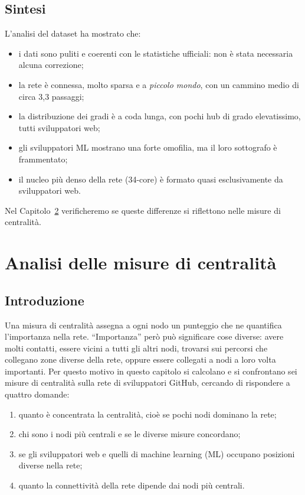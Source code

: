 \documentclass[11pt]{report}
\begin{document}
\section{Sintesi}
\label{sec:sintesi_dataset}
L'analisi del dataset ha mostrato che:
\begin{itemize}
  \item i dati sono puliti e coerenti con le statistiche ufficiali: non è stata necessaria alcuna correzione;
  \item la rete è connessa, molto sparsa e a \emph{piccolo mondo}, con un cammino medio di circa 3,3 passaggi;
  \item la distribuzione dei gradi è a coda lunga, con pochi hub di grado elevatissimo, tutti sviluppatori web;
  \item gli sviluppatori ML mostrano una forte omofilia, ma il loro sottografo è frammentato;
  \item il nucleo più denso della rete (34-core) è formato quasi esclusivamente da sviluppatori web.
\end{itemize}
Nel Capitolo~\ref{cap:centralita} verificheremo se queste differenze si riflettono nelle misure di centralità.


\chapter{Analisi delle misure di centralità}
\label{cap:centralita}

\section{Introduzione}
\label{sec:ce_intro}

Una misura di centralità assegna a ogni nodo un punteggio che ne quantifica
l'importanza nella rete. ``Importanza'' però può significare cose diverse: avere
molti contatti, essere vicini a tutti gli altri nodi, trovarsi sui percorsi che
collegano zone diverse della rete, oppure essere collegati a nodi a loro volta
importanti. Per questo motivo in questo capitolo si calcolano e si confrontano sei
misure di centralità sulla rete di sviluppatori GitHub, cercando di rispondere a
quattro domande:
\begin{enumerate}
  \item quanto è concentrata la centralità, cioè se pochi nodi dominano la rete;
  \item chi sono i nodi più centrali e se le diverse misure concordano;
  \item se gli sviluppatori web e quelli di machine learning (ML) occupano
        posizioni diverse nella rete;
  \item quanto la connettività della rete dipende dai nodi più centrali.
\end{enumerate}
\end{document}
